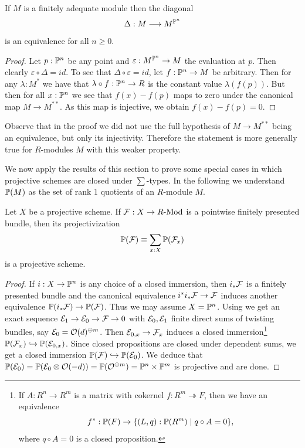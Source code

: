 \begin{lemma}
If $M$ is a finitely adequate module then the diagonal
\[
  \Delta : M \longrightarrow M^{\mathbb{P}^n}
\]
is an equivalence for all $n \geq 0$.
\end{lemma}

\begin{proof}
  Let $p : \mathbb{P}^n$ be any point and $\varepsilon : M^{\mathbb{P}^n} \to M$ the evaluation at $p$.
  Then clearly $\varepsilon \circ \Delta = id$.
  To see that $\Delta \circ \varepsilon = id$, let $f : \mathbb{P}^n \to M$ be arbitrary.
  Then for any $\lambda : M^\ast$ we have that $\lambda \circ f : \mathbb{P}^n \to R$ is the constant value $\lambda (f(p))$.
  But then for all $x:\mathbb{P}^n$ we see that $f(x) - f(p)$ maps to zero under the canonical map $M \to M^{\ast\ast}$.
  As this map is injective, we obtain $f(x) - f(p) = 0$.
\end{proof}

Observe that in the proof we did not use the full hypothesis of $M \to M^{\ast\ast}$ being an equivalence, but only its injectivity.
Therefore the statement is more generally true for $R$-modules $M$ with this weaker property.

We now apply the results of this section to prove some special cases in which projective schemes are closed under $\sum$-types.
In the following we understand $\mathbb{P}(M)$ as the set of rank $1$ quotients of an $R$-module $M$.

\begin{lemma}
  \label{projectivization-is-projective}
  Let $X$ be a projective scheme.
  If $\mathcal{F}: X \to R\text{-}\mathrm{Mod}$ is a pointwise finitely presented bundle, then its projectivization
  \[
    \mathbb{P}(\mathcal{F}) \equiv \sum_{x:X}\mathbb{P}(\mathcal{F}_x)
  \]
  is a projective scheme.
\end{lemma}

\begin{proof}
  If $i:X \to \mathbb{P}^n$ is any choice of a closed immersion, then $i_\ast\mathcal{F}$ is a finitely presented bundle and the canonical equivalence $i^\ast i_\ast\mathcal{F} \to \mathcal{F}$ induces another equivalence $\mathbb{P}(i_\ast\mathcal{F}) \to \mathbb{P}(\mathcal{F})$.
  Thus we may assume $X = \mathbb{P}^n$.
  Using  we get an exact sequence $\mathcal{E}_1 \to \mathcal{E}_0 \to \mathcal{F} \to 0$ with $\mathcal{E}_0,\mathcal{E}_1$ finite direct sums of twisting bundles, say $\mathcal{E}_0 = \mathcal{O}(d)^{\oplus m}$.
Then $\mathcal{E}_{0,x} \to \mathcal{F}_x$ induces a closed immersion\footnote{
    If $A:R^n \to R^m$ is a matrix with cokernel $f:R^m \twoheadrightarrow F$, then we have an equivalence
    \[
      f^\ast:\bP(F) \to \{ (L,q):\bP(R^m) \;|\; q \circ A = 0 \}
      \rlap{,}
    \]
    where $q \circ A = 0$ is a closed proposition.
  }
  $\bP(\mc F_x) \lhook\joinrel\to \bP(\mc E_{0,x})$.
  Since closed propositions are closed under dependent sums, we get a closed immersion $\bP(\mc F) \lhook\joinrel\to \bP(\mc E_0)$.
  We deduce that $\mathbb{P}(\mathcal{E}_0) = \mathbb{P}(\mathcal{E}_0 \otimes \mathcal{O}(-d)) = \mathbb{P}(\mathcal{O}^{\oplus m}) = \mathbb{P}^n \times \mathbb{P}^m$ is projective and are done.
\end{proof}

